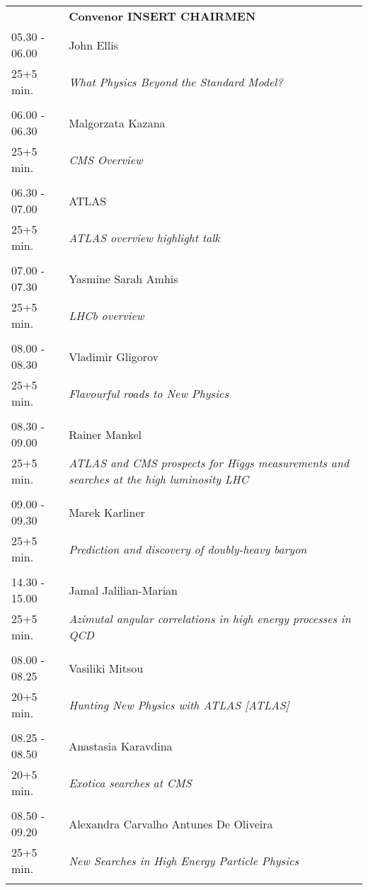 \begin{longtable}{p{3cm}p{13cm}}
&\hfill {\bf Convenor INSERT CHAIRMEN }\\ 
05.30 - 06.00 & John Ellis\\ 
25+5 min. & {\it What Physics Beyond the Standard Model?}\\ 
 & \\ 
06.00 - 06.30 & Malgorzata Kazana\\ 
25+5 min. & {\it CMS Overview}\\ 
 & \\ 
06.30 - 07.00 & ATLAS\\ 
25+5 min. & {\it ATLAS overview highlight talk}\\ 
 & \\ 
07.00 - 07.30 & Yasmine Sarah Amhis\\ 
25+5 min. & {\it LHCb overview}\\ 
 & \\ 
08.00 - 08.30 & Vladimir Gligorov\\ 
25+5 min. & {\it Flavourful roads to New Physics}\\ 
 & \\ 
08.30 - 09.00 & Rainer Mankel\\ 
25+5 min. & {\it ATLAS and CMS prospects for Higgs measurements and searches at the high luminosity LHC}\\ 
 & \\ 
09.00 - 09.30 & Marek Karliner\\ 
25+5 min. & {\it Prediction and discovery of doubly-heavy baryon}\\ 
 & \\ 
14.30 - 15.00 & Jamal Jalilian-Marian\\ 
25+5 min. & {\it Azimutal angular correlations in high energy processes in QCD}\\ 
 & \\ 
08.00 - 08.25 & Vasiliki Mitsou\\ 
20+5 min. & {\it Hunting New Physics with ATLAS [ATLAS]}\\ 
 & \\ 
08.25 - 08.50 & Anastasia Karavdina\\ 
20+5 min. & {\it Exotica searches at CMS}\\ 
 & \\ 
08.50 - 09.20 & Alexandra Carvalho Antunes De Oliveira\\ 
25+5 min. & {\it New Searches in High Energy Particle Physics}\\ 
 & \\ 

\end{longtable}
